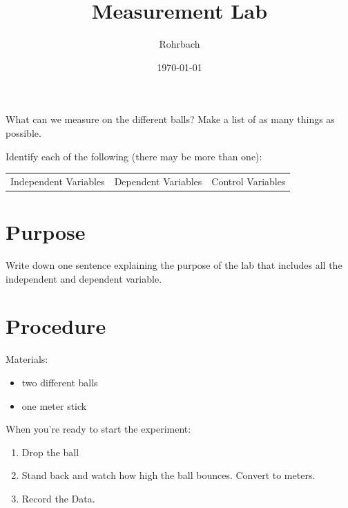 \documentclass[10pt]{exam}
\title{Measurement Lab}
\author{Rohrbach}
\date{\today}
\begin{document}
\maketitle

\vspace{-2em}
\begin{questions}
  
    \question
      What can we measure on the different balls?  Make 
      a list of as many things as possible. 
      \vs[3]

    \question
      Identify each of the following (there may be more 
      than one):
      
      \begin{center}
        \begin{tabular}
          { m{} | m{}| m{} } 
          Independent Variables & 
          Dependent Variables   & 
          Control Variables  \\[8em]
        \end{tabular}
      \end{center}
    
  
\end{questions}

\section*{Purpose}
Write down one sentence explaining the purpose of the lab that includes all the independent and dependent variable.
\vs[2]

\section*{Procedure}

Materials:

\begin{itemize}[topsep=0pt,itemsep=-1ex,partopsep=1ex,parsep=1ex]
  \item two different balls
  \item one meter stick
\end{itemize}


\noindent When you're ready to start the experiment:

\begin{enumerate}[topsep=0pt,itemsep=-1ex,partopsep=1ex,parsep=1ex]
  \item Drop the ball
  \item Stand back and watch how high the ball bounces.  Convert to meters.
  \item Record the Data.
\end{enumerate}
\end{document}
